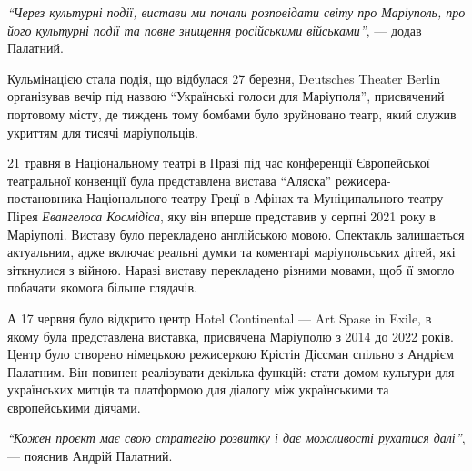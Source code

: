 
\begin{leftbar}
\emph{\enquote{Через культурні події, вистави ми почали розповідати світу про Маріуполь, про
його культурні події та повне знищення російськими військами}}, — додав
Палатний.
\end{leftbar}

Кульмінацією стала подія, що відбулася 27 березня, Deutsches Theater Berlin
організував вечір під назвою \enquote{Українські голоси для Маріуполя}, присвячений
портовому місту, де тиждень тому бомбами було зруйновано театр, який служив
укриттям для тисячі маріупольців. 


21 травня в Національному театрі в Празі під час конференції Європейської
театральної конвенції була представлена вистава \enquote{Аляска} режисера-постановника
Національного театру Грецї в Афінах та Муніципального театру Пірея \emph{Евангелоса
Космідіса}, яку він вперше представив у серпні 2021 року в Маріуполі. Виставу
було перекладено англійською мовою. Спектакль залишається актуальним, адже
включає реальні думки та коментарі маріупольських дітей, які зіткнулися з
війною. Наразі виставу перекладено різними мовами, щоб її змогло побачати
якомога більше глядачів.


А 17 червня було відкрито центр Hotel Continental — Art Spase in Exile, в якому
була представлена виставка, присвячена Маріуполю з 2014 до 2022 років. Центр
було створено німецькою режисеркою Крістін Діссман спільно з Андрієм Палатним.
Він повинен реалізувати декілька функцій: стати домом культури для українських
митців та платформою для діалогу між українськими та європейськими діячами.

\begin{leftbar}
\emph{\enquote{Кожен проєкт має свою стратегію розвитку і дає можливості рухатися далі}}, — пояснив Андрій Палатний.
\end{leftbar}

